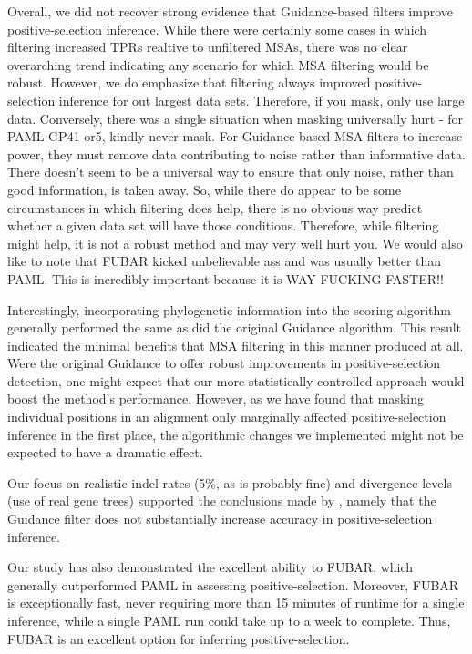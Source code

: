 \documentclass[11pt]{article}
\begin{document}
Overall, we did not recover strong evidence that Guidance-based filters improve positive-selection inference. While there were certainly some cases in which filtering increased TPRs realtive to unfiltered MSAs, there was no clear overarching trend indicating any scenario for which MSA filtering would be robust. However, we do emphasize that filtering always improved positive-selection inference for out largest data sets. Therefore, if you mask, only use large data.
Conversely, there was a single situation when masking universally hurt - for PAML GP41 or5, kindly never mask. 
For Guidance-based MSA filters to increase power, they must remove data contributing to noise rather than informative data. There doesn't seem to be a universal way to ensure that only noise, rather than good information, is taken away. So, while there do appear to be some circumstances in which filtering does help, there is no obvious way predict whether a given data set will have those conditions. Therefore, while filtering might help, it is not a robust method and may very well hurt you. 
We would also like to note that FUBAR kicked unbelievable ass and was usually better than PAML. This is incredibly important because it is WAY FUCKING FASTER!!

Interestingly, incorporating phylogenetic information into the scoring algorithm generally performed the same as did the original Guidance algorithm. This result indicated the minimal benefits that MSA filtering in this manner produced at all. Were the original Guidance to offer robust improvements in positive-selection detection, one might expect that our more statistically controlled approach would boost the method's performance. However, as we have found that masking individual positions in an alignment only marginally affected positive-selection inference in the first place, the algorithmic changes we implemented might not be expected to have a dramatic effect.

Our focus on realistic indel rates (5\%, as is probably fine) and divergence levels (use of real gene trees) supported the conclusions made by \citet{Jordan2012}, namely that the Guidance filter does not substantially increase accuracy in positive-selection inference.

Our study has also demonstrated the excellent ability to FUBAR, which generally outperformed PAML in assessing positive-selection. Moreover, FUBAR is exceptionally fast, never requiring more than 15 minutes of runtime for a single inference, while a single PAML run could take up to a week to complete. Thus, FUBAR is an excellent option for inferring positive-selection.
\end{document}
